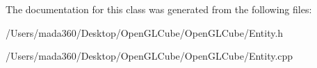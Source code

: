 The documentation for this class was generated from the following files\+:\begin{DoxyCompactItemize}
\item 
/\+Users/mada360/\+Desktop/\+Open\+G\+L\+Cube/\+Open\+G\+L\+Cube/Entity.\+h\item 
/\+Users/mada360/\+Desktop/\+Open\+G\+L\+Cube/\+Open\+G\+L\+Cube/Entity.\+cpp\end{DoxyCompactItemize}
